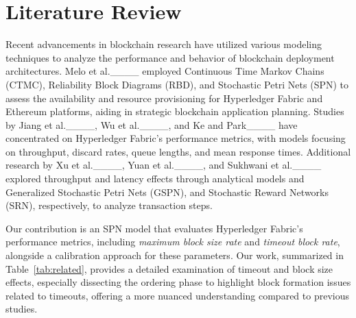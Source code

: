 \section{Literature Review}
\label{sec:rel}

Recent advancements in blockchain research have utilized various modeling techniques to analyze the performance and behavior of blockchain deployment architectures. Melo et al.____ employed Continuous Time Markov Chains (CTMC), Reliability Block Diagrams (RBD), and Stochastic Petri Nets (SPN) to assess the availability and resource provisioning for Hyperledger Fabric and Ethereum platforms, aiding in strategic blockchain application planning. Studies by Jiang et al.____, Wu et al.____, and Ke and Park____ have concentrated on Hyperledger Fabric's performance metrics, with models focusing on throughput, discard rates, queue lengths, and mean response times. Additional research by Xu et al.____, Yuan et al.____, and Sukhwani et al.____ explored throughput and latency effects through analytical models and Generalized Stochastic Petri Nets (GSPN), and Stochastic Reward Networks (SRN), respectively, to analyze transaction steps.

Our contribution is an SPN model that evaluates Hyperledger Fabric's performance metrics, including \textit{maximum block size rate} and \textit{timeout block rate}, alongside a calibration approach for these parameters. Our work, summarized in Table~\ref{tab:related}, provides a detailed examination of timeout and block size effects, especially dissecting the ordering phase to highlight block formation issues related to timeouts, offering a more nuanced understanding compared to previous studies.

